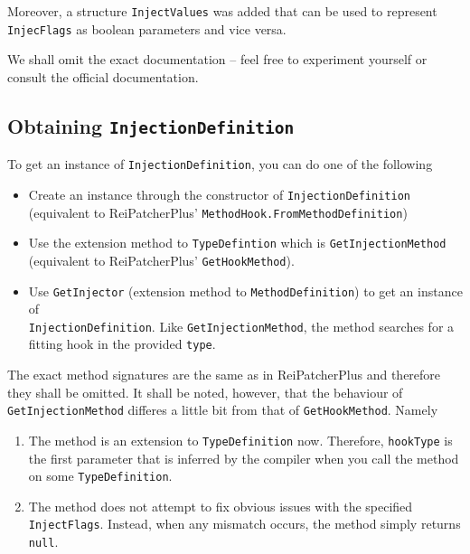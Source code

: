 \documentclass[a4paper,11pt]{article}
\begin{document}
Moreover, a structure \texttt{InjectValues} was added that can be used to represent \texttt{InjecFlags} as boolean parameters and vice versa.

We shall omit the exact documentation -- feel free to experiment yourself or consult the official documentation.

\subsection{Obtaining \texttt{InjectionDefinition}}
To get an instance of \texttt{InjectionDefinition}, you can do one of the following
\begin{itemize}
\item Create an instance through the constructor of \texttt{InjectionDefinition} 
\\ (equivalent to ReiPatcherPlus' \texttt{MethodHook.FromMethodDefinition})
\item Use the extension method to \texttt{TypeDefintion} which is \texttt{GetInjectionMethod} (equivalent to ReiPatcherPlus' \texttt{GetHookMethod}).
\item Use \texttt{GetInjector} (extension method to \texttt{MethodDefinition}) to get an instance of \\ \texttt{InjectionDefinition}. Like \texttt{GetInjectionMethod}, the method searches for a fitting hook in the provided \texttt{type}.
\end{itemize}
The exact method signatures are the same as in ReiPatcherPlus and therefore they shall be omitted. It shall be noted, however, that the behaviour of \texttt{GetInjectionMethod} differes a little bit from that of \texttt{GetHookMethod}. Namely
\begin{enumerate}
\item The method is an extension to \texttt{TypeDefinition} now. Therefore, \texttt{hookType} is the first parameter that is inferred by the compiler when you call the method on some \texttt{TypeDefinition}.
\item The method does not attempt to fix obvious issues with the specified \texttt{InjectFlags}. Instead, when any mismatch occurs, the method simply returns \texttt{null}.
\end{enumerate}
\end{document}
